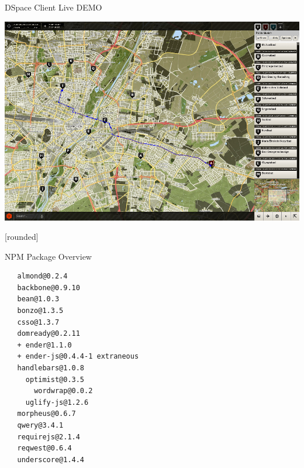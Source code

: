 \documentclass{beamer}
\newcommand\Fontvi{\fontsize{6}{7.2}\selectfont}
\begin{document}
\begin{frame}{DSpace Client Live DEMO}
 \linebreak
 \begin{center}
  \includegraphics[scale=0.3]{images/dspace_client_ui}
 \end{center}
\end{frame}

[rounded]
\begin{frame}[fragile]{NPM Package Overview}
\Fontvi
{}
\begin{block}{}
\begin{lstlisting}
   almond@0.2.4
   backbone@0.9.10
   bean@1.0.3
   bonzo@1.3.5
   csso@1.3.7
   domready@0.2.11
   + ender@1.1.0
   + ender-js@0.4.4-1 extraneous
   handlebars@1.0.8
     optimist@0.3.5
       wordwrap@0.0.2
     uglify-js@1.2.6
   morpheus@0.6.7
   qwery@3.4.1
   requirejs@2.1.4
   reqwest@0.6.4
   underscore@1.4.4
\end{lstlisting}
\end{block}
\end{frame}
\end{document}
